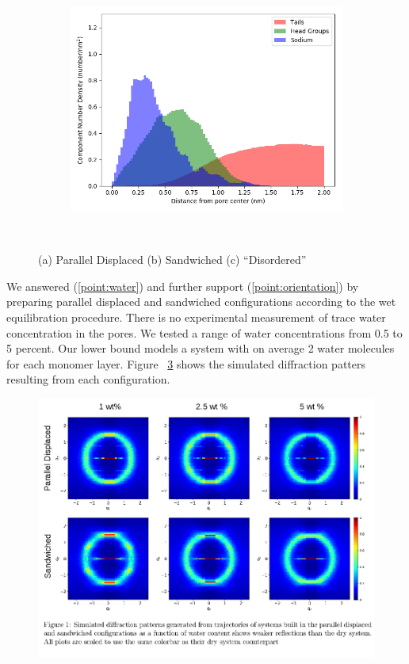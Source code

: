 \documentclass{article}
\begin{document}
\begin{figure}
\begin{subfigure}{0.55\textwidth}
        \includegraphics[width=1\linewidth]{disordered_density.png}
        \caption{}
        \label{fig:offset_density}
  \end{subfigure}
  \caption{(a) Parallel Displaced (b) Sandwiched (c) ``Disordered''}~\label{fig:densities}
  \end{figure}

  We answered (\ref{point:water}) and further support (\ref{point:orientation})
  by preparing parallel displaced and sandwiched configurations according to the
  wet equilibration procedure. There is no experimental measurement of trace
  water concentration in the pores. We tested a range of water concentrations
  from 0.5 to 5 percent. Our lower bound models a system with on average 2 water
  molecules for each monomer layer. Figure ~\ref{fig:solvation} shows the
  simulated diffraction patters resulting from each configuration.

  \begin{figure}
	\centering
	\includegraphics[width=\textwidth]{solvation.png}  %
	\label{fig:solvation}
  \end{figure}
\end{document}
